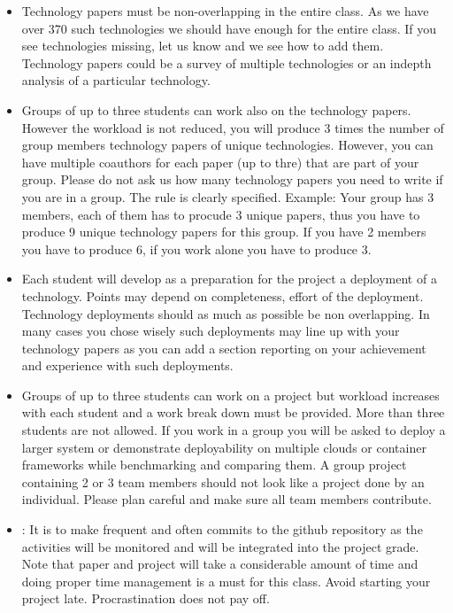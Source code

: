 \begin{itemize}
\item {} 
 Technology papers must be non-overlapping in
the entire class. As we have over 370 such technologies we should
have enough for the entire class. If you see technologies missing,
let us know and we see how to add them. Technology papers could be a
survey of multiple technologies or an indepth analysis of a
particular technology.

\item {} 
 Groups of up to three students can work
also on the technology papers. However the workload is not reduced,
you will produce 3 times the number of group members technology
papers of unique technologies. However, you can have multiple
coauthors for each paper (up to thre) that are part of your
group. Please do not ask us how many technology papers you need to
write if you are in a group. The rule is clearly specified. Example:
Your group has 3 members, each of them has to procude 3 unique
papers, thus you have to produce 9 unique technology papers for this
group. If you have 2 members you have to produce 6, if you work
alone you have to produce 3.

\item {} 
 Each student will
develop as a preparation for the project a deployment of a
technology. Points may depend on completeness, effort of the
deployment. Technology deployments should as much as possible be non
overlapping. In many cases you chose wisely such deployments may
line up with your technology papers as you can add a section
reporting on your achievement and experience with such
deployments.

\item {} 
 Groups of up to three students can work on a
project but workload increases with each student and a work break
down must be provided.  More than three students are not allowed. If
you work in a group you will be asked to deploy a larger system or
demonstrate deployability on multiple clouds or container frameworks
while benchmarking and comparing them. A group project containing 2
or 3 team members should not look like a project done by an
individual. Please plan careful and make sure all team members
contribute.

\item {} 
: It is  to make frequent and
often commits to the github repository as the activities will be
monitored and will be integrated into the project grade.  Note that
paper and project will take a considerable amount of time and doing
proper time management is a must for this class. Avoid starting your
project late. Procrastination does not pay off.


\end{itemize}
